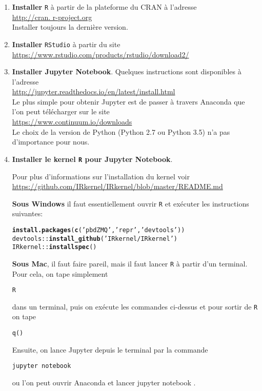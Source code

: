 \documentclass[11pt]{article}
\makeatletter
\numberwithin{equation}{section}
\theoremstyle{remark}
\newenvironment{kframe}{%
 \def\at@end@of@kframe{}%
 \ifinner\ifhmode%
  \def\at@end@of@kframe{\end{minipage}}%
  \begin{minipage}{\columnwidth}%
 \fi\fi%
 \def\FrameCommand##1{\hskip\@totalleftmargin \hskip-\fboxsep
 \colorbox{shadecolor}{##1}\hskip-\fboxsep
     \hskip-\linewidth \hskip-\@totalleftmargin \hskip\columnwidth}%
 \MakeFramed {\advance\hsize-\width
   \@totalleftmargin\z@ \linewidth\hsize
   \@setminipage}}%
 {\par\unskip\endMakeFramed%
 \at@end@of@kframe}
\newenvironment{knitrout}{}{}
\newcommand{\hlstr}[1]{\textcolor[rgb]{0.43,0.21,0.1}{#1}}%
\newcommand{\hlopt}[1]{\textcolor[rgb]{0,0,0}{#1}}%
\newcommand{\hlstd}[1]{\textcolor[rgb]{0,0.2,0.4}{#1}}%
\newcommand{\hlkwd}[1]{\textcolor[rgb]{0.76,0.13,0.28}{\textbf{#1}}}%
\makeatother
\begin{document}
\begin{enumerate}
 \item \textbf{Installer} \texttt{R} à partir de la plateforme du CRAN à l'adresse \\ \url{http://cran. r-project.org}\\ Installer toujours la dernière version.
\item  \textbf{Installer}  \texttt{RStudio} à partir du site\\ \url{https://www.rstudio.com/products/rstudio/download2/}
\item  {\bf Installer   Jupyter Notebook}.  Quelques instructions sont disponibles à l'adresse\\
\url{http://jupyter.readthedocs.io/en/latest/install.html}\\
Le plus simple pour obtenir Jupyter est de passer à travers Anaconda que l'on peut télécharger sur le site\\ \url{https://www.continuum.io/downloads}\\
 Le choix de la version de Python (Python 2.7 ou Python 3.5) n'a pas d'importance pour nous.

\item {\bf Installer le kernel \texttt{R} pour Jupyter Notebook}. 

Pour plus d'informations sur l'installation du kernel voir\\
 \url{https://github.com/IRkernel/IRkernel/blob/master/README.md}
 
 
{\bf Sous Windows} il faut essentiellement  ouvrir \texttt{R} et exécuter les instructions suivantes:
\begin{knitrout}
\color{fgcolor}\begin{kframe}
\begin{alltt}
\hlkwd{install.packages}\hlstd{(}\hlkwd{c}\hlstd{(}\hlstr{'pbdZMQ'}\hlstd{,} \hlstr{'repr'}\hlstd{,} \hlstr{'devtools'}\hlstd{))}
\hlstd{devtools}\hlopt{::}\hlkwd{install_github}\hlstd{(}\hlstr{'IRkernel/IRkernel'}\hlstd{)}
\hlstd{IRkernel}\hlopt{::}\hlkwd{installspec}\hlstd{()}
\end{alltt}
\end{kframe}
\end{knitrout}

{\bf Sous Mac}, il faut faire pareil, mais il faut lancer \texttt{R} à partir d'un terminal. Pour cela, on tape simplement
\begin{verbatim}
R
\end{verbatim}
dans un terminal, puis on exécute les commandes ci-dessus et pour sortir de \texttt{R} on tape
\begin{verbatim}
q()
\end{verbatim}
Ensuite, on lance Jupyter depuis le terminal par la commande
\begin{verbatim}
jupyter notebook
\end{verbatim}
ou l'on peut ouvrir Anaconda et lancer \og{}jupyter notebook \fg{}.


\end{enumerate}
\end{document}
